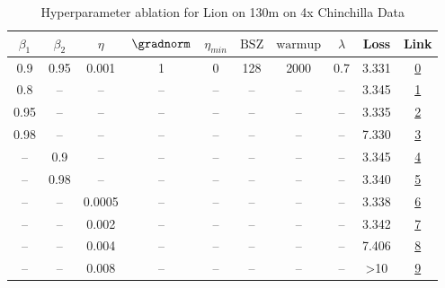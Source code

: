\begin{table}[H]
\centering
\caption{Hyperparameter ablation for Lion on 130m on 4x Chinchilla Data}
\label{tab:ablation_lion_130m_on_4x_chinchilla_data}
\begin{tabular}{cccccccccc}
\toprule
$\beta_1$ & $\beta_2$ & $\eta$ & $\gradnorm$ & $\eta_{min}$ & $\mathrm{BSZ}$ & $\mathrm{warmup}$ & $\lambda$ & Loss & Link \\
\midrule
0.9 & 0.95 & 0.001 & 1 & 0 & 128 & 2000 & 0.7 & 3.331 & \href{https://wandb.ai/stanford-mercury/optimizer-scaling/runs/sweep-130m-10B-liondd8061alr0.001-wd0.7-minlr0-warmup2000-b10.9--72b789}{0} \\
\midrule
0.8 & -- & -- & -- & -- & -- & -- & -- & 3.345 & \href{https://wandb.ai/stanford-mercury/optimizer-scaling/runs/sweep-130m-10B-lion6ebc4dlr0.001-wd0.7-minlr0-warmup2000-b10.8-b-9ccc4b}{1} \\
0.95 & -- & -- & -- & -- & -- & -- & -- & 3.335 & \href{https://wandb.ai/stanford-mercury/optimizer-scaling/runs/sweep-130m-10B-lionk6ee825lr0.001-wd0.7-minlr0-warmup2000-b10.95-4aeb28}{2} \\
0.98 & -- & -- & -- & -- & -- & -- & -- & 7.330 & \href{https://wandb.ai/stanford-mercury/optimizer-scaling/runs/sweep-130m-10B-lionk98635alr0.001-wd0.7-minlr0-warmup2000-b10.98-20924d}{3} \\
-- & 0.9 & -- & -- & -- & -- & -- & -- & 3.345 & \href{https://wandb.ai/stanford-mercury/optimizer-scaling/runs/sweep-130m-10B-lioncda5edlr0.001-wd0.7-minlr0-warmup2000-b10.9-b-6a3aec}{4} \\
-- & 0.98 & -- & -- & -- & -- & -- & -- & 3.340 & \href{https://wandb.ai/stanford-mercury/optimizer-scaling/runs/sweep-130m-10B-lion489f64lr0.001-wd0.7-minlr0-warmup2000-b10.9-b-e5b223}{5} \\
-- & -- & 0.0005 & -- & -- & -- & -- & -- & 3.338 & \href{https://wandb.ai/stanford-mercury/optimizer-scaling/runs/sweep-130m-10B-lionfc33e8lr0.0005-wd0.7-minlr0-warmup2000-b10.9--abc4e2}{6} \\
-- & -- & 0.002 & -- & -- & -- & -- & -- & 3.342 & \href{https://wandb.ai/stanford-mercury/optimizer-scaling/runs/sweep-130m-10B-lionp2ece3elr0.002-wd0.7-minlr0-warmup2000-b10.9--9f5952}{7} \\
-- & -- & 0.004 & -- & -- & -- & -- & -- & 7.406 & \href{https://wandb.ai/stanford-mercury/optimizer-scaling/runs/sweep-130m-10B-liond13cd19lr0.004-wd0.7-minlr0-warmup2000-b10.9--ef33c1}{8} \\
-- & -- & 0.008 & -- & -- & -- & -- & -- & >10 & \href{https://wandb.ai/stanford-mercury/optimizer-scaling/runs/sweep-130m-10B-lionbfc5e9lr0.008-wd0.7-minlr0-warmup2000-b10.9-b-1af583}{9} \\

\end{tabular}
\end{table}
